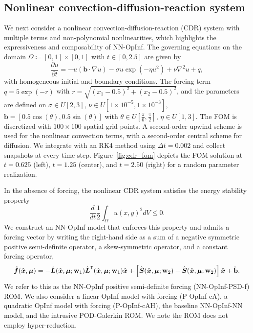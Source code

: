 \documentclass[3p,computermodern,11pt]{elsarticle}
\numberwithin{equation}{section}
\newcommand{\reducedState}{\hat{\state}}
\newcommand{\dt}{\Delta t}
\newcommand{\reducedSpdMatrixLowerNN}{\hat{\boldsymbol L}}
\newcommand{\reducedSkewMatrixLowerNN}{\hat{\boldsymbol S}}
\newcommand{\weights}{\mathbf{w}}
\newcommand{\reducedVelocity}{\skew{4}\hat{\velocity}}
\newcommand{\state}{\boldsymbol x}
\newcommand{\velocity}{\boldsymbol f}
\newcommand{\params}{\boldsymbol \mu}
\newcommand{\spatialDomain}{\Omega}
\newcommand{\romDim}{K}
\begin{document}
\subsection{Nonlinear convection-diffusion-reaction system}
We next consider a nonlinear convection-diffusion-reaction (CDR) system with multiple terms and non-polynomial nonlinearities, which highlights the expressiveness and composability of NN-OpInf.
The governing equations on the domain $\spatialDomain \coloneqq [0,1] \times [0,1]$ with $t \in [0,2.5]$ are given by
$$\frac{\partial u}{\partial t} =  - u \left(\boldsymbol b \cdot \nabla u \right)  - \sigma  u \exp(-\eta u^2) +  \nu \nabla^2 u + q,$$
with homogeneous initial and boundary conditions.  The forcing term $q=5\exp(-r)$ with $r = \sqrt{ (x_1 - 0.5)^2 + (x_2 - 0.5)^2 }$, and the parameters are defined on $\sigma \in U[2,3]$, $\nu \in U[1 \times 10^{-5},1\times 10^{-3}]$, $\mathbf{b} = [0.5 \cos(\theta),0.5\sin(\theta) ]$ with $\theta \in U[\frac{\pi}{6},\frac{\pi}{2}]$, $\eta \in U[1,3]$.
The FOM is discretized with $100 \times 100$ spatial grid points. A second-order upwind scheme is used for the nonlinear convection terms, with a second-order central scheme for diffusion. We integrate with an RK4 method using $\dt = 0.002$ and collect snapshots at every time step. Figure~\ref{fig:cdr_fom} depicts the FOM solution at $t=0.625$ (left), $t=1.25$ (center), and $t=2.50$ (right) for a random parameter realization. 

In the absence of forcing, the nonlinear CDR system satisfies the energy stability property
$$\frac{d}{dt}\frac{1}{2}\int_{\Omega} u(x,y)^2 dV \le 0.$$ We construct an NN-OpInf model that enforces this property and admits a forcing vector by writing the right-hand side as a sum of a negative symmetric positive semi-definite operator, a skew-symmetric operator, and a constant forcing operator,
\begin{equation}\label{eq:nnopinf_pd_f}
\reducedVelocity(\reducedState,\params) =  -\reducedSpdMatrixLowerNN(\reducedState,\params;\weights_1) \reducedSpdMatrixLowerNN^\intercal(\reducedState,\params; \weights_1) \reducedState + 
\left[ \reducedSkewMatrixLowerNN(\reducedState,\params;\weights_2) - \reducedSkewMatrixLowerNN(\reducedState,\params;\weights_2) \right] \reducedState  + \skew{-4}\hat{\mathbf{b}}.
\end{equation}
We refer to this as the NN-OpInf positive semi-definite forcing (NN-OpInf-PSD-f) ROM.
We also consider a linear OpInf model with forcing (P-OpInf-cA), a quadratic OpInf model with forcing (P-OpInf-cAH), the baseline NN-OpInf-NN model, and the intrusive POD-Galerkin ROM. We note the ROM does not employ hyper-reduction. 
 
\end{document}
